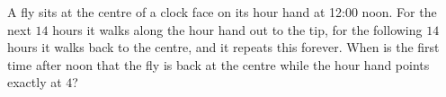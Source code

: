 A fly sits at the centre of a clock face on its hour hand at 12:00 noon. For the next $14$ hours it walks along the hour hand out to the tip, for the following $14$ hours it walks back to the centre, and it repeats this forever. When is the first time after noon that the fly is back at the centre while the hour hand points exactly at $4$?
